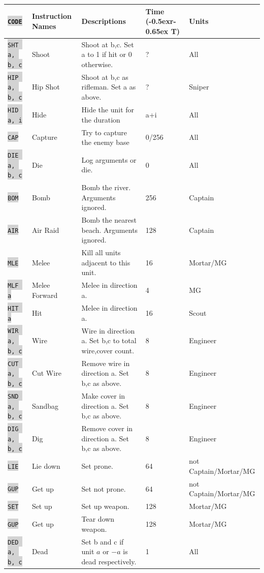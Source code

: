 \documentclass{article}
\newcommand{\vnscode}[1]{\colorbox{lightgray}{\lstinline[language=vns]{#1}}}
\newcommand{\RT}{\lower-0.5ex\hbox{r}\kern-0.65ex T}
\begin{document}
\begin{minipage}{\textwidth}
\label{table:combat}
\centering
\begin{tabular}{lllll}
    \hline \vnscode{CODE} & Instruction Names & Descriptions & Time (\RT) & Units \\ \hline
    \vnscode{SHT a, b, c} & Shoot & Shoot at b,c. Set a to 1 if hit or 0 otherwise. & ? & All \\
    \vnscode{HIP a, b, c} & Hip Shot & Shoot at b,c as rifleman. Set a as above. & ? & Sniper \\
    \vnscode{HID a, i} & Hide & Hide the unit for the duration & a+i & All \\
    \vnscode{CAP} & Capture & Try to capture the enemy base & 0/256 & All \\
    \vnscode{DIE a, b, c} & Die & Log arguments or die. & 0 & All \\
    \vnscode{BOM} & Bomb & Bomb the river. Arguments ignored. & 256 & Captain \\
    \vnscode{AIR} & Air Raid & Bomb the nearest beach. Arguments ignored. & 128 & Captain \\
    \vnscode{MLE} & Melee & Kill all units adjacent to this unit. & 16 & Mortar/MG \\
    \vnscode{MLF a} & Melee Forward & Melee in direction a. & 4 & MG \\
    \vnscode{HIT a} & Hit & Melee in direction a. & 16 & Scout \\
    \vnscode{WIR a, b, c} & Wire & Wire in direction a. Set b,c to total wire,cover count. & 8 & Engineer \\
    \vnscode{CUT a, b, c} & Cut Wire & Remove wire in direction a. Set b,c as above. & 8 & Engineer \\
    \vnscode{SND a, b, c} & Sandbag & Make cover in direction a. Set b,c as above. & 8 & Engineer \\
    \vnscode{DIG a, b, c} & Dig & Remove cover in direction a. Set b,c as above. & 8 & Engineer \\
    \vnscode{LIE} & Lie down & Set prone. & 64 & not Captain/Mortar/MG \\
    \vnscode{GUP} & Get up & Set not prone. & 64 & not Captain/Mortar/MG \\
    \vnscode{SET} & Set up & Set up weapon. & 128 & Mortar/MG \\
    \vnscode{GUP} & Get up & Tear down weapon. & 128 & Mortar/MG \\
    \vnscode{DED a, b, c} & Dead & Set b and c if unit $a$ or $-a$ is dead respectively. & 1 & All \\
\end{tabular}
\end{minipage}
\end{document}
